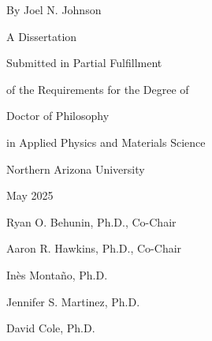 \begin{centering}
\begin{large}
\begin{spacing}{1.8}

\vspace*{\baselineskip}

\dissertationTitle{}

\thispagestyle{empty} %

\vspace{\baselineskip}

By Joel N. Johnson


A Dissertation

Submitted in Partial Fulfillment

of the Requirements for the Degree of


Doctor of Philosophy

in Applied Physics and Materials Science

\vspace{\baselineskip}

Northern Arizona University

May 2025

\vspace{2\baselineskip}


Ryan O. Behunin, Ph.D., Co-Chair

Aaron R. Hawkins, Ph.D., Co-Chair

Inès Montaño, Ph.D.

Jennifer S. Martinez, Ph.D.

David Cole, Ph.D.

\end{spacing}
\end{large}
\end{centering}
